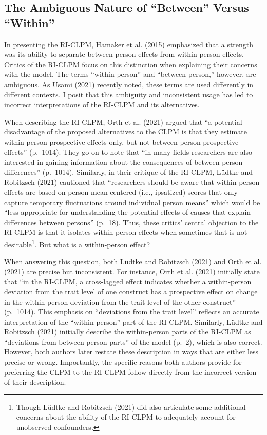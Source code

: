 \documentclass[
  english,
  man,floatsintext]{apa6}
\begin{document}
\hypertarget{the-ambiguous-nature-of-between-versus-within}{%
\subsection{The Ambiguous Nature of ``Between'' Versus ``Within''}\label{the-ambiguous-nature-of-between-versus-within}}

In presenting the RI-CLPM, Hamaker et al. (2015) emphasized that a strength was its ability to separate between-person effects from within-person effects. Critics of the RI-CLPM focus on this distinction when explaining their concerns with the model. The terms ``within-person'' and ``between-person,'' however, are ambiguous. As Usami (2021) recently noted, these terms are used differently in different contexts. I posit that this ambiguity and inconsistent usage has led to incorrect interpretations of the RI-CLPM and its alternatives.

When describing the RI-CLPM, Orth et al. (2021) argued that ``a potential disadvantage of the proposed alternatives to the CLPM is that they estimate within-person prospective effects only, but not between-person prospective effects'' (p.~1014). They go on to note that ``in many fields researchers are also interested in gaining information about the consequences of between-person differences'' (p.~1014). Similarly, in their critique of the RI-CLPM, Lüdtke and Robitzsch (2021) cautioned that ``researchers should be aware that within-person effects are based on person-mean centered (i.e., ipsatized) scores that only capture temporary fluctuations around individual person means'' which would be ``less appropriate for understanding the potential effects of causes that explain differences between persons'' (p.~18). Thus, these critics' central objection to the RI-CLPM is that it isolates within-person effects when sometimes that is not desirable\footnote{Though Lüdtke and Robitzsch (2021) did also articulate some additional concerns about the ability of the RI-CLPM to adequately account for unobserved confounders.}. But what is a within-person effect?

When answering this question, both Lüdtke and Robitzsch (2021) and Orth et al. (2021) are precise but inconsistent. For instance, Orth et al. (2021) initially state that ``in the RI-CLPM, a cross-lagged effect indicates whether a within-person deviation from the trait level of one construct has a prospective effect on change in the within-person deviation from the trait level of the other construct'' (p.~1014). This emphasis on ``deviations from the trait level'' reflects an accurate interpretation of the ``within-person'' part of the RI-CLPM. Similarly, Lüdtke and Robitzsch (2021) initially describe the within-person parts of the RI-CLPM as ``deviations from between-person parts'' of the model (p.~2), which is also correct. However, both authors later restate these description in ways that are either less precise or wrong. Importantly, the specific reasons both authors provide for preferring the CLPM to the RI-CLPM follow directly from the incorrect version of their description.
\end{document}
